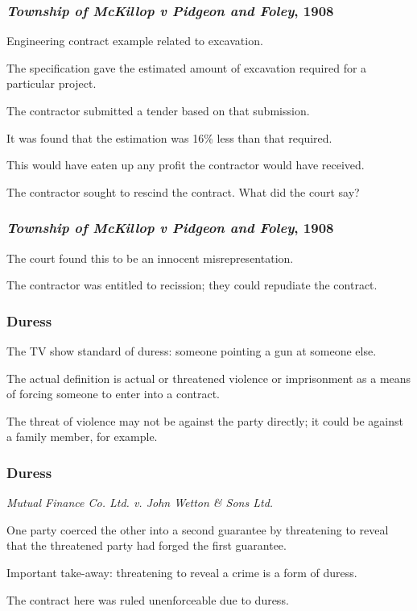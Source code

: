 \begin{frame}
\frametitle{\textit{Township of McKillop v Pidgeon and Foley}, 1908}

Engineering contract example related to excavation.

The specification gave the estimated amount of excavation required for a particular project.

The contractor submitted a tender based on that submission.

It was found that the estimation was 16\% less than that required.

This would have eaten up any profit the contractor would have received.

The contractor sought to rescind the contract. What did the court say?

\end{frame}



\begin{frame}
\frametitle{\textit{Township of McKillop v Pidgeon and Foley}, 1908}

The court found this to be an innocent misrepresentation. 

The contractor was entitled to recission; they could repudiate the contract.


\end{frame}



\begin{frame}
\frametitle{Duress}

The TV show standard of duress: someone pointing a gun at someone else.

The actual definition is actual or threatened violence or imprisonment as a means of forcing someone to enter into a contract.

The threat of violence may not be against the party directly; it could be against a family member, for example.

\end{frame}



\begin{frame}
\frametitle{Duress}

\textit{Mutual Finance Co. Ltd. v. John Wetton \& Sons Ltd.}

One party coerced the other into a second guarantee by threatening to reveal that the threatened party had forged the first guarantee.

Important take-away: threatening to reveal a crime is a form of duress.

The contract here was ruled unenforceable due to duress.

\end{frame}



